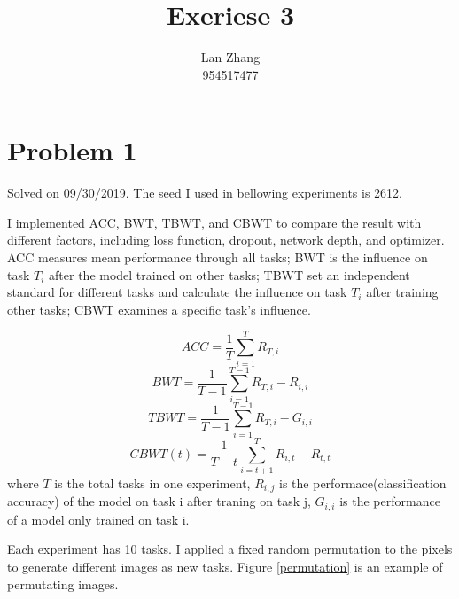 \documentclass{article}
\title{Exeriese 3}
\author{%
  Lan Zhang\\
  954517477\\
}
\begin{document}
\maketitle

\section{Problem 1}

Solved on 09/30/2019. The seed I used in bellowing experiments is 2612. 

I implemented ACC, BWT, TBWT, and CBWT to compare the result with different factors, including loss function, dropout, network depth, and optimizer. ACC measures mean performance through all tasks; BWT is the influence on task $T_i$ after the model trained on other tasks; TBWT set an independent standard for different tasks and calculate the influence on task $T_i$ after training other tasks; CBWT examines a specific task's influence.

$$ACC = \frac{1}{T}\sum_{i=1}^TR_{T,i}$$
$$BWT = \frac{1}{T-1}\sum_{i=1}^{T-1}R_{T,i}-R_{i,i}$$
$$TBWT = \frac{1}{T-1}\sum_{i=1}^{T-1}R_{T,i}-G_{i,i}$$
$$CBWT(t) = \frac{1}{T-t}\sum_{i=t+1}^{T}R_{i,t}-R_{t,t}$$
where $T$ is the total tasks in one experiment, $R_{i, j}$ is the performace(classification accuracy) of the model on task i after traning on task j, $G_{i, i}$ is the performance of a model only trained on task i.

Each experiment has 10 tasks. I applied a fixed random permutation to the pixels to generate different images as new tasks. Figure \ref{permutation} is an example of permutating images.  
\end{document}
